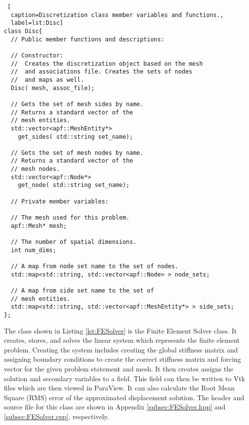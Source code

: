 \documentclass[a4paper, 12pt]{article}
\begin{document}
\begin{lstlisting} [
  caption=Discretization class member variables and functions.,
  label=lst:Disc]
class Disc{
  // Public member functions and descriptions:

  // Constructor:
  //  Creates the discretization object based on the mesh
  //  and associations file. Creates the sets of nodes
  //  and maps as well.
  Disc( mesh, assoc_file);

  // Gets the set of mesh sides by name.
  // Returns a standard vector of the
  // mesh entities.
  std::vector<apf::MeshEntity*>
    get_sides( std::string set_name);

  // Gets the set of mesh nodes by name.
  // Returns a standard vector of the
  // mesh nodes.
  std::vector<apf::Node*>
    get_node( std::string set_name);

  // Private member variables:

  // The mesh used for this problem.
  apf::Mesh* mesh;

  // The number of spatial dimensions.
  int num_dims;

  // A map from node set name to the set of nodes.
  std::map<std::string, std::vector<apf::Node> > node_sets;

  // A map from side set name to the set of
  // mesh entities.
  std::map<std::string, std::vector<apf::MeshEntity*> > side_sets;
};
\end{lstlisting}
\vspace{\baselineskip}

The class shown in Listing
\ref{lst:FESolver} is the
Finite Element Solver
class.
It creates, stores, and solves the linear system which represents
the finite element problem. Creating the system includes creating the
global stiffness matrix and assigning boundary conditions to create
the correct stiffness matrix and forcing vector for the given
problem statement and mesh. It then creates assigns the solution
and secondary variables to a field. This field can then be written
to Vtk files which are then viewed in ParaView. It can also calculate the
Root Mean Square (RMS) error of the approximated displacement solution.
The header and source file for this class are shown in Appendix
\ref{subsec:FESolver.hpp} and
\ref{subsec:FESolver.cpp},
respectively.
\end{document}
